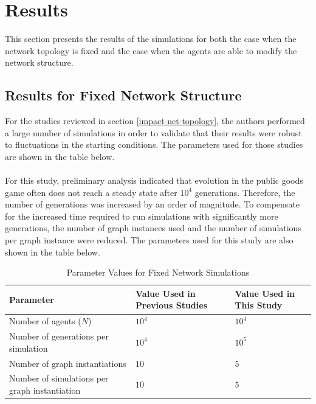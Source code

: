 \documentclass{article}
\begin{document}
	\section{Results}
	This section presents the results of the simulations for both the case when the network topology is fixed and the case when the agents are able to modify the network structure.

	\subsection{Results for Fixed Network Structure}
	For the studies reviewed in section \ref{impact-net-topology}, the authors performed a large number of simulations in order to validate that their results were robust to fluctuations in the starting conditions.  The parameters used for those studies are shown in the table below.
	\paragraph{}For this study, preliminary analysis indicated that evolution in the public goods game often does not reach a steady state after $10^4$ generations.  Therefore, the number of generations was increased by an order of magnitude.  To compensate for the increased time required to run simulations with significantly more generations, the number of graph instances used and the number of simulations per graph instance were reduced.  The parameters used for this study are also shown in the table below.

	\begin{table}[h!]
		\begin{center}
		\begin{tabu} to \textwidth {X[0.66,l,m]X[0.17,c,m]X[0.17,c,m]}
		\toprule
		Parameter&Value Used in Previous Studies&Value Used in This Study\\
		\midrule
		Number of agents ($N$)&$10^4$&$10^4$\\
		Number of generations per simulation&$10^4$&$10^5$\\
		Number of graph instantiations&$10$&$5$\\
		Number of simulations per graph instantiation&$10$&$5$\\
		\bottomrule
		\end{tabu}
		\caption{Parameter Values for Fixed Network Simulations}
		\end{center}
	\end{table}
\end{document}
